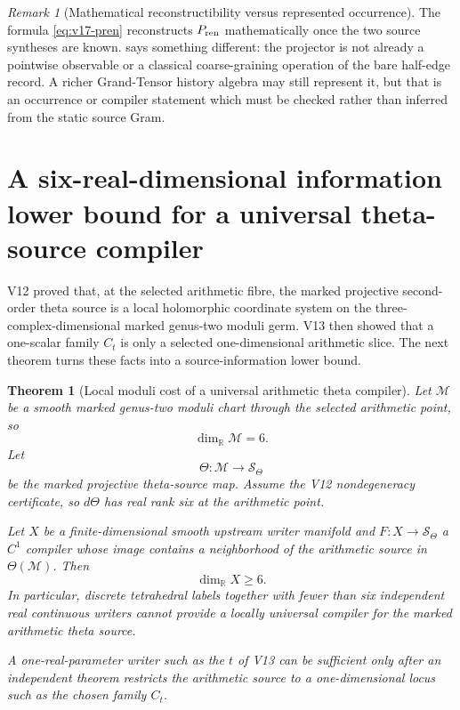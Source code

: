 \documentclass[11pt]{article}
\newtheorem{theorem}{Theorem}[section]
\theoremstyle{definition}
\theoremstyle{remark}
\newtheorem{remark}[remark]{Remark}
\begin{document}
\begin{remark}[Mathematical reconstructibility versus represented occurrence]
\label{fire:v17-projector-occurrence}
The formula \eqref{eq:v17-pren} reconstructs $P_{\rm ren}$ mathematically once
the two source syntheses are known.   says
something different: the projector is not already a pointwise observable or a
classical coarse-graining operation of the bare half-edge record.  A richer
Grand-Tensor history algebra may still represent it, but that is an occurrence
or compiler statement which must be checked rather than inferred from the
static source Gram.
\end{remark}

\section{A six-real-dimensional information lower bound for a universal theta-source compiler}
\label{sec:v17-moduli-cost}

V12 proved that, at the selected arithmetic fibre, the marked projective
second-order theta source is a local holomorphic coordinate system on the
three-complex-dimensional marked genus-two moduli germ.  V13 then showed that a
one-scalar family $C_t$ is only a selected one-dimensional arithmetic slice.
The next theorem turns these facts into a source-information lower bound.

\begin{theorem}[Local moduli cost of a universal arithmetic theta compiler]
\label{thm:v17-moduli-cost}
Let $\mathcal M$ be a smooth marked genus-two moduli chart through the selected
arithmetic point, so
\[
 \dim_{\mathbb R}\mathcal M=6.
\]
Let
\[
 \Theta:\mathcal M\longrightarrow\mathscr S_\Theta
\]
be the marked projective theta-source map.  Assume the V12 nondegeneracy
certificate, so $d\Theta$ has real rank six at the arithmetic point.

Let $X$ be a finite-dimensional smooth upstream writer manifold and
$F:X\to\mathscr S_\Theta$ a $C^1$ compiler whose image contains a neighborhood
of the arithmetic source in $\Theta(\mathcal M)$.  Then
\[
 \boxed{\dim_{\mathbb R}X\ge6.}
 \tag{V17.12}\label{eq:v17-six-cost}
\]
In particular, discrete tetrahedral labels together with fewer than six
independent real continuous writers cannot provide a locally universal
compiler for the marked arithmetic theta source.

A one-real-parameter writer such as the $t$ of V13 can be sufficient only
after an independent theorem restricts the arithmetic source to a
one-dimensional locus such as the chosen family $C_t$.
\end{theorem}
\end{document}
